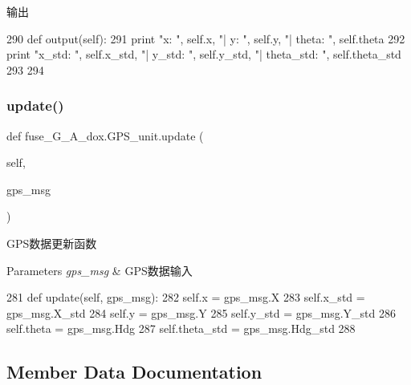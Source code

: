 输出 


\begin{DoxyCode}
290     \textcolor{keyword}{def }output(self):
291         \textcolor{keywordflow}{print} \textcolor{stringliteral}{"x: "}, self.x, \textcolor{stringliteral}{"| y: "}, self.y, \textcolor{stringliteral}{"| theta: "}, self.theta
292         \textcolor{keywordflow}{print} \textcolor{stringliteral}{"x\_std: "}, self.x\_std, \textcolor{stringliteral}{"| y\_std: "}, self.y\_std, \textcolor{stringliteral}{"| theta\_std: "}, self.theta\_std
293 
294 
\end{DoxyCode}
\mbox{\label{classfuse___g___a__dox_1_1_g_p_s__unit_acc33497e0247428c5c90fe1d0f36d546}} 
\subsubsection{\texorpdfstring{update()}{update()}}
{\footnotesize\ttfamily def fuse\+\_\+\+G\+\_\+\+A\+\_\+dox.\+G\+P\+S\+\_\+unit.\+update (\begin{DoxyParamCaption}\item[{}]{self,  }\item[{}]{gps\+\_\+msg }\end{DoxyParamCaption})}



G\+P\+S数据更新函数 


\begin{DoxyParams}{Parameters}
{\em gps\+\_\+msg} & G\+P\+S数据输入 \\
\hline
\end{DoxyParams}

\begin{DoxyCode}
281     \textcolor{keyword}{def }update(self, gps\_msg):
282         self.x = gps\_msg.X
283         self.x\_std = gps\_msg.X\_std
284         self.y = gps\_msg.Y
285         self.y\_std = gps\_msg.Y\_std
286         self.theta = gps\_msg.Hdg
287         self.theta\_std = gps\_msg.Hdg\_std
288 
\end{DoxyCode}


\subsection{Member Data Documentation}
\mbox{\label{classfuse___g___a__dox_1_1_g_p_s__unit_ab848ec313c0eef141c37505721a05987}} 

